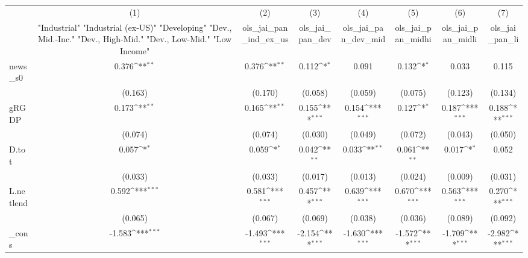 {
\def\sym#1{\ifmmode^{#1}\else\(^{#1}\)\fi}
\begin{tabular}{l*{7}{c}}
\toprule
            &\multicolumn{1}{c}{(1)}&\multicolumn{1}{c}{(2)}&\multicolumn{1}{c}{(3)}&\multicolumn{1}{c}{(4)}&\multicolumn{1}{c}{(5)}&\multicolumn{1}{c}{(6)}&\multicolumn{1}{c}{(7)}\\
            &\multicolumn{1}{c}{ "Industrial" "Industrial (ex-US)" "Developing" "Dev., Mid.-Inc." "Dev., High-Mid."  "Dev., Low-Mid." "Low Income" }&\multicolumn{1}{c}{ols\_jai\_pan\_ind\_ex\_us}&\multicolumn{1}{c}{ols\_jai\_pan\_dev}&\multicolumn{1}{c}{ols\_jai\_pan\_dev\_mid}&\multicolumn{1}{c}{ols\_jai\_pan\_midhi}&\multicolumn{1}{c}{ols\_jai\_pan\_midli}&\multicolumn{1}{c}{ols\_jai\_pan\_li}\\
\midrule
news\_s0     &       0.376\sym{**} &       0.376\sym{**} &       0.112\sym{*}  &       0.091         &       0.132\sym{*}  &       0.033         &       0.115         \\
            &     (0.163)         &     (0.170)         &     (0.058)         &     (0.059)         &     (0.075)         &     (0.123)         &     (0.134)         \\
\addlinespace
gRGDP       &       0.173\sym{**} &       0.165\sym{**} &       0.155\sym{***}&       0.154\sym{***}&       0.127\sym{*}  &       0.187\sym{***}&       0.188\sym{***}\\
            &     (0.074)         &     (0.074)         &     (0.030)         &     (0.049)         &     (0.072)         &     (0.043)         &     (0.050)         \\
\addlinespace
D.tot       &       0.057\sym{*}  &       0.059\sym{*}  &       0.042\sym{**} &       0.033\sym{**} &       0.061\sym{**} &       0.017\sym{*}  &       0.052         \\
            &     (0.033)         &     (0.033)         &     (0.017)         &     (0.013)         &     (0.024)         &     (0.009)         &     (0.031)         \\
\addlinespace
L.netlend   &       0.592\sym{***}&       0.581\sym{***}&       0.457\sym{***}&       0.639\sym{***}&       0.670\sym{***}&       0.563\sym{***}&       0.270\sym{***}\\
            &     (0.065)         &     (0.067)         &     (0.069)         &     (0.038)         &     (0.036)         &     (0.089)         &     (0.092)         \\
\addlinespace
\_cons      &      -1.583\sym{***}&      -1.493\sym{***}&      -2.154\sym{***}&      -1.630\sym{***}&      -1.572\sym{***}&      -1.709\sym{***}&      -2.982\sym{***}\\

\end{tabular}}
